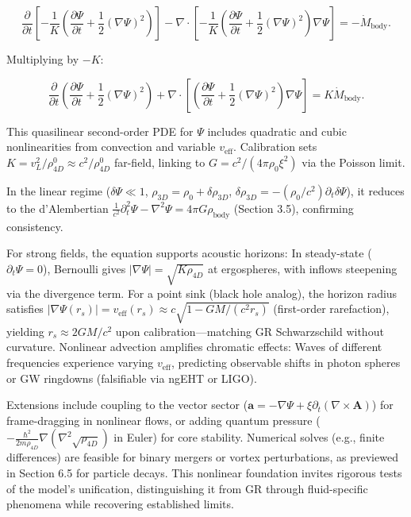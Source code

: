 \[
\frac{\partial}{\partial t} \left[ -\frac{1}{K} \left( \frac{\partial \Psi}{\partial t} + \frac{1}{2} (\nabla \Psi)^2 \right) \right] - \nabla \cdot \left[ -\frac{1}{K} \left( \frac{\partial \Psi}{\partial t} + \frac{1}{2} (\nabla \Psi)^2 \right) \nabla \Psi \right] = -\dot{M}_{\text{body}}.
\]

Multiplying by $-K$:

\[
\frac{\partial}{\partial t} \left( \frac{\partial \Psi}{\partial t} + \frac{1}{2} (\nabla \Psi)^2 \right) + \nabla \cdot \left[ \left( \frac{\partial \Psi}{\partial t} + \frac{1}{2} (\nabla \Psi)^2 \right) \nabla \Psi \right] = K \dot{M}_{\text{body}}.
\]

This quasilinear second-order PDE for $\Psi$ includes quadratic and cubic nonlinearities from convection and variable $v_{\text{eff}}$. Calibration sets $K = v_L^2 / \rho_{4D}^0 \approx c^2 / \rho_{4D}^0$ far-field, linking to $G = c^2 / (4\pi \rho_0 \xi^2)$ via the Poisson limit.

In the linear regime ($\delta \Psi \ll 1$, $\rho_{3D} = \rho_0 + \delta \rho_{3D}$, $\delta \rho_{3D} = -(\rho_0 / c^2) \partial_t \delta \Psi$), it reduces to the d'Alembertian $\frac{1}{c^2} \partial_t^2 \Psi - \nabla^2 \Psi = 4\pi G \rho_{\text{body}}$ (Section 3.5), confirming consistency.

For strong fields, the equation supports acoustic horizons: In steady-state ($\partial_t \Psi = 0$), Bernoulli gives $|\nabla \Psi| = \sqrt{K \rho_{4D}}$ at ergospheres, with inflows steepening via the divergence term. For a point sink (black hole analog), the horizon radius satisfies $|\nabla \Psi(r_s)| = v_{\text{eff}}(r_s) \approx c \sqrt{1 - GM/(c^2 r_s)}$ (first-order rarefaction), yielding $r_s \approx 2GM/c^2$ upon calibration---matching GR Schwarzschild without curvature. Nonlinear advection amplifies chromatic effects: Waves of different frequencies experience varying $v_{\text{eff}}$, predicting observable shifts in photon spheres or GW ringdowns (falsifiable via ngEHT or LIGO).

Extensions include coupling to the vector sector ($\mathbf{a} = -\nabla \Psi + \xi \partial_t (\nabla \times \mathbf{A})$) for frame-dragging in nonlinear flows, or adding quantum pressure ($-\frac{\hbar^2}{2m \rho_{4D}} \nabla (\nabla^2 \sqrt{\rho_{4D}})$ in Euler) for core stability. Numerical solves (e.g., finite differences) are feasible for binary mergers or vortex perturbations, as previewed in Section 6.5 for particle decays. This nonlinear foundation invites rigorous tests of the model's unification, distinguishing it from GR through fluid-specific phenomena while recovering established limits.

